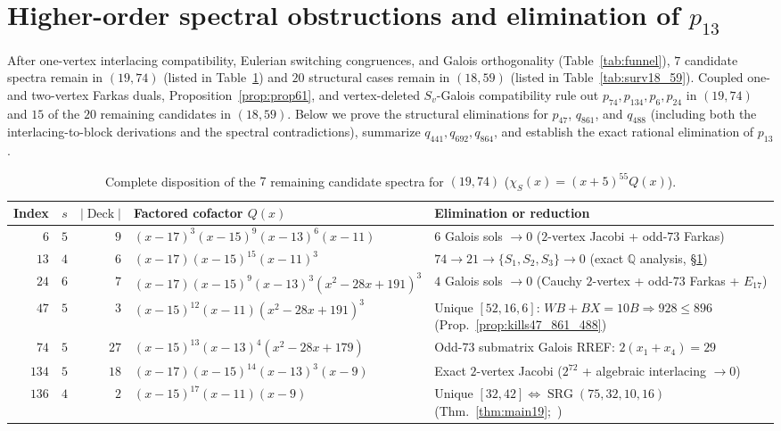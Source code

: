 \documentclass[11pt,reqno]{amsart}
\theoremstyle{definition}
\theoremstyle{remark}
\DeclareMathOperator{\SRG}{SRG}
\DeclareMathOperator{\Deck}{Deck}
\begin{document}
\section{Higher-order spectral obstructions and elimination of \texorpdfstring{$p_{13}$}{p\_13}}\label{sec:phase3}

After one-vertex interlacing compatibility, Eulerian switching congruences, and Galois orthogonality (Table~\ref{tab:funnel}), $7$ candidate spectra remain in $(19, 74)$ (listed in Table~\ref{tab:surv19_74}) and $20$ structural cases remain in $(18, 59)$ (listed in Table~\ref{tab:surv18_59}). Coupled one- and two-vertex Farkas duals, Proposition~\ref{prop:prop61}, and vertex-deleted $S_v$-Galois compatibility rule out $p_{74}, p_{134}, p_6, p_{24}$ in $(19, 74)$ and $15$ of the $20$ remaining candidates in $(18, 59)$. Below we prove the structural eliminations for $p_{47}$, $q_{861}$, and $q_{488}$ (including both the interlacing-to-block derivations and the spectral contradictions), summarize $q_{441}, q_{692}, q_{864}$, and establish the exact rational elimination of $p_{13}$.

\begin{table}[htbp]
\centering
\caption{Complete disposition of the $7$ remaining candidate spectra for $(19, 74)$ ($\chi_S(x) = (x+5)^{55} Q(x)$).}\label{tab:surv19_74}
\scriptsize
\setlength{\tabcolsep}{3.5pt}
\begin{tabular}{@{}rrrl>{\raggedright\arraybackslash}p{2.3in}@{}}
\toprule
Index & $s$ & $|\Deck|$ & Factored cofactor $Q(x)$ & Elimination or reduction \\
\midrule
$6$ & $5$ & $9$ & $(x-17)^3(x-15)^9(x-13)^6(x-11)$ & $6$ Galois sols $\to 0$ ($2$-vertex Jacobi + odd-$73$ Farkas) \\
$13$ & $4$ & $6$ & $(x-17)(x-15)^{15}(x-11)^3$ & $74 \to 21 \to \{S_1,S_2,S_3\} \to 0$ (exact $\mathbb{Q}$ analysis, \S\ref{sec:phase3}) \\
$24$ & $6$ & $7$ & $(x-17)(x-15)^9(x-13)^3(x^2-28x+191)^3$ & $4$ Galois sols $\to 0$ (Cauchy $2$-vertex + odd-$73$ Farkas + $E_{17}$) \\
$47$ & $5$ & $3$ & $(x-15)^{12}(x-11)(x^2-28x+191)^3$ & Unique $[52,16,6]$: $WB+BX=10B \Rightarrow 928 \le 896$ (Prop.~\ref{prop:kills47_861_488}) \\
$74$ & $5$ & $27$ & $(x-15)^{13}(x-13)^4(x^2-28x+179)$ & Odd-$73$ submatrix Galois RREF: $2(x_1+x_4)=29$ \\
$134$ & $5$ & $18$ & $(x-17)(x-15)^{14}(x-13)^3(x-9)$ & Exact $2$-vertex Jacobi ($2^{72}$ + algebraic interlacing $\to 0$) \\
$136$ & $4$ & $2$ & $(x-15)^{17}(x-11)(x-9)$ & Unique $[32,42] \Longleftrightarrow \SRG(75,32,10,16)$ (Thm.~\ref{thm:main19};~\cite{AzarijaMarc2018}) \\
\bottomrule
\end{tabular}
\end{table}
\end{document}
